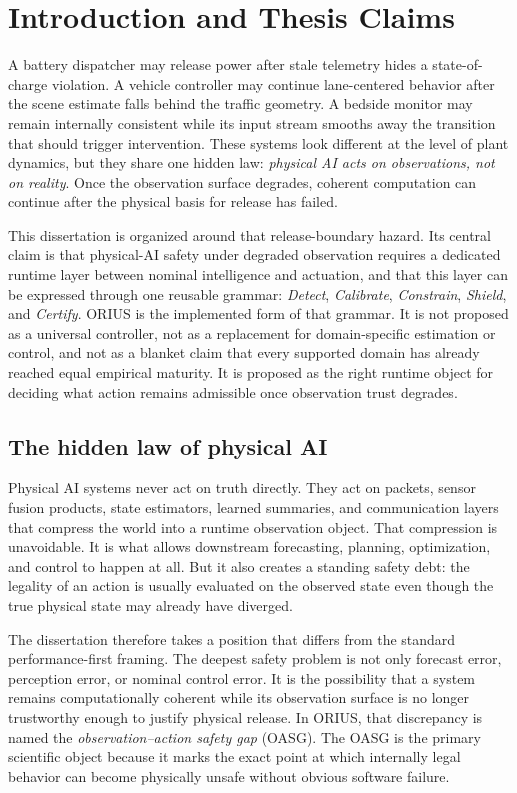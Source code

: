 \chapter{Introduction and Thesis Claims}
\label{ch:introduction-thesis-claims}

A battery dispatcher may release power after stale telemetry hides a state-of-charge
violation. A vehicle controller may continue lane-centered behavior after the scene estimate
falls behind the traffic geometry. A bedside monitor may remain internally consistent while
its input stream smooths away the transition that should trigger intervention. These systems
look different at the level of plant dynamics, but they share one hidden law:
\emph{physical AI acts on observations, not on reality}. Once the observation surface
degrades, coherent computation can continue after the physical basis for release has failed.

This dissertation is organized around that release-boundary hazard. Its central claim is that
physical-AI safety under degraded observation requires a dedicated runtime layer between nominal
intelligence and actuation, and that this layer can be expressed through one reusable grammar:
\emph{Detect}, \emph{Calibrate}, \emph{Constrain}, \emph{Shield}, and \emph{Certify}. ORIUS is
the implemented form of that grammar. It is not proposed as a universal controller, not as a
replacement for domain-specific estimation or control, and not as a blanket claim that every
supported domain has already reached equal empirical maturity. It is proposed as the right
runtime object for deciding what action remains admissible once observation trust degrades.

\section{The hidden law of physical AI}
Physical AI systems never act on truth directly. They act on packets, sensor fusion products,
state estimators, learned summaries, and communication layers that compress the world into a
runtime observation object. That compression is unavoidable. It is what allows downstream
forecasting, planning, optimization, and control to happen at all. But it also creates a
standing safety debt: the legality of an action is usually evaluated on the observed state even
though the true physical state may already have diverged.

The dissertation therefore takes a position that differs from the standard performance-first
framing. The deepest safety problem is not only forecast error, perception error, or nominal
control error. It is the possibility that a system remains computationally coherent while its
observation surface is no longer trustworthy enough to justify physical release. In ORIUS, that
discrepancy is named the \emph{observation--action safety gap} (OASG). The OASG is the primary
scientific object because it marks the exact point at which internally legal behavior can become
physically unsafe without obvious software failure.

